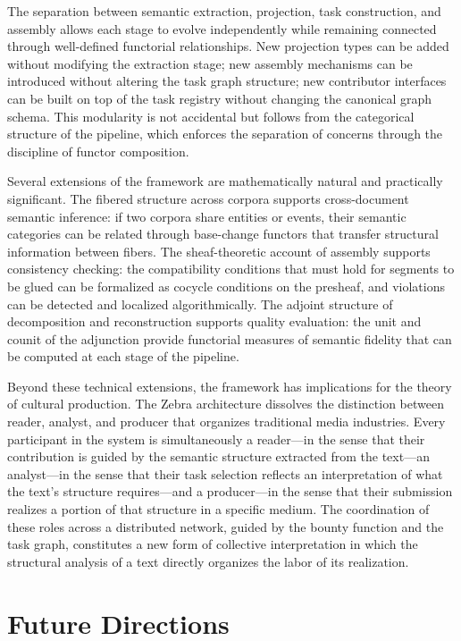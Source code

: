 \documentclass[12pt,a4paper]{article}
\begin{document}
The separation between semantic extraction, projection, task construction, and assembly allows each stage to evolve independently while remaining connected through well-defined functorial relationships. New projection types can be added without modifying the extraction stage; new assembly mechanisms can be introduced without altering the task graph structure; new contributor interfaces can be built on top of the task registry without changing the canonical graph schema. This modularity is not accidental but follows from the categorical structure of the pipeline, which enforces the separation of concerns through the discipline of functor composition.

Several extensions of the framework are mathematically natural and practically significant. The fibered structure across corpora supports cross-document semantic inference: if two corpora share entities or events, their semantic categories can be related through base-change functors that transfer structural information between fibers. The sheaf-theoretic account of assembly supports consistency checking: the compatibility conditions that must hold for segments to be glued can be formalized as cocycle conditions on the presheaf, and violations can be detected and localized algorithmically. The adjoint structure of decomposition and reconstruction supports quality evaluation: the unit and counit of the adjunction provide functorial measures of semantic fidelity that can be computed at each stage of the pipeline.

Beyond these technical extensions, the framework has implications for the theory of cultural production. The Zebra architecture dissolves the distinction between reader, analyst, and producer that organizes traditional media industries. Every participant in the system is simultaneously a reader—in the sense that their contribution is guided by the semantic structure extracted from the text—an analyst—in the sense that their task selection reflects an interpretation of what the text's structure requires—and a producer—in the sense that their submission realizes a portion of that structure in a specific medium. The coordination of these roles across a distributed network, guided by the bounty function and the task graph, constitutes a new form of collective interpretation in which the structural analysis of a text directly organizes the labor of its realization.

\section{Future Directions}
\end{document}
